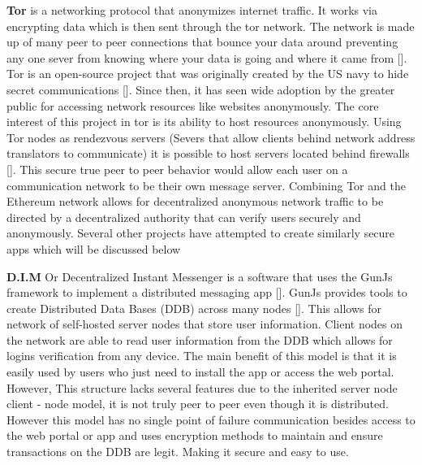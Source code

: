 \documentclass{article}
\begin{document}
\textbf{Tor} is a networking protocol that anonymizes internet traffic. 
It works via encrypting data which is then sent through the tor network. 
The network is made up of many peer to peer connections that bounce your data around preventing any one sever from knowing where your data is going and where it came from []. 
Tor is an open-source project that was originally created by the US navy to hide secret communications [].
Since then, it has seen wide adoption by the greater public for accessing network resources like websites anonymously. 
The core interest of this project in tor is its ability to host resources anonymously. 
Using Tor nodes as rendezvous servers (Severs that allow clients behind network address translators to communicate) it is possible to host servers located behind firewalls []. 
This secure true peer to peer behavior would allow each user on a communication network to be their own message server.
Combining Tor and the Ethereum network allows for decentralized anonymous network traffic to be directed by a decentralized authority that can verify users securely and anonymously. 
Several other projects have attempted to create similarly secure apps which will be discussed below

\textbf{D.I.M} Or Decentralized Instant Messenger is a software that uses the GunJs framework to implement a distributed messaging app []. %
GunJs provides tools to create Distributed Data Bases (DDB) across many nodes []. 
This allows for network of self-hosted server nodes that store user information. 
Client nodes on the network are able to read user information from the DDB which allows for logins verification from any device. 
The main benefit of this model is that it is easily used by users who just need to install the app or access the web portal.
However, This structure lacks several features due to the inherited server node client - node model, it is not truly peer to peer even though it is distributed.  %
However this model has no single point of failure communication besides access to the web portal or app and uses encryption methods to maintain and ensure transactions on the DDB are legit. 
Making it secure and easy to use. 
\end{document}
